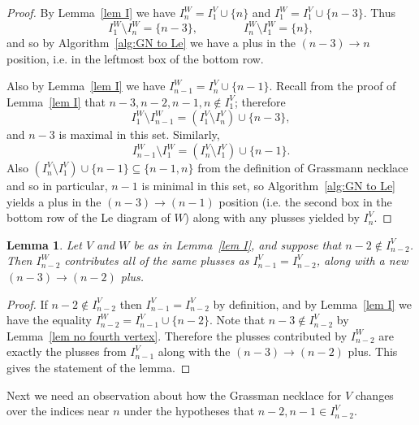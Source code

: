 \documentclass[11pt]{article}
\newtheorem{lem}[thm]{Lemma}
\theoremstyle{remark}
\theoremstyle{definition}
\begin{document}
\begin{proof}
By Lemma~\ref{lem I} we have $I_n^{W}= I_1^{V} \cup \{n\}$ and $I_1^{W} = I_1^{V} \cup \{n-3\}$. Thus 
\[I_1^{W} \setminus I_n^{W} = \{n-3\}, \qquad \qquad I_n^{W} \setminus I_1^{W} = \{n\},\]
and so by Algorithm~\ref{alg:GN to Le} we have a plus in the $(n-3) \rightarrow n$ position, i.e. in the leftmost box of the bottom row. 

Also by Lemma~\ref{lem I} we have $I_{n-1}^{W} = I_n^{V} \cup \{n-1\}$. Recall from the proof of Lemma~\ref{lem I} that $n-3,n-2,n-1,n \not\in I_1^V$; therefore
\[
I_1^W\setminus I_{n-1}^W = (I_1^V \setminus I_n^V) \cup\{n-3\},
\]
and $n-3$ is maximal in this set. Similarly, 
\[I_{n-1}^W \setminus I_1^W = (I_n^V \setminus I_1^V) \cup \{n-1\}.
\]
Also $(I_n^V \setminus I_1^V) \cup \{n-1\}\subseteq \{n-1,n\}$ from the definition of Grassmann necklace and so in particular, $n-1$ is minimal in this set, so Algorithm~\ref{alg:GN to Le} yields a plus in the $(n-3) \rightarrow (n-1)$ position (i.e. the second box in the bottom row of the Le diagram of $W$) along with any plusses yielded by $I_n^V$.
\end{proof} 



\begin{lem}\label{lem n-2 good}
  Let $V$ and $W$ be as in Lemma~\ref{lem I}, and suppose that $n-2 \not\in I_{n-2}^{V}$. Then $I_{n-2}^{W}$ contributes all of the same plusses as $I_{n-1}^{V}=I_{n-2}^{V}$, along with a new $(n-3)\rightarrow (n-2)$ plus.
\end{lem}

\begin{proof}
If $n-2\not\in I_{n-2}^{V}$ then $I_{n-1}^{V}=I_{n-2}^{V}$ by definition, and by Lemma~\ref{lem I} we have the equality ${I_{n-2}^{W} = I_{n-1}^{V} \cup \{n-2\}}$.  Note that $n-3\not\in I_{n-2}^{V}$ by Lemma~\ref{lem no fourth vertex}.  Therefore the plusses contributed by $I_{n-2}^{W}$ are exactly the  plusses from $I_{n-1}^{V}$ along with the $(n-3)\rightarrow (n-2)$ plus.  This gives the statement of the lemma.
\end{proof}

Next we need an observation about how the Grassman necklace for $V$ changes over the indices near $n$ under the hypotheses that $n-2, n-1\in I_{n-2}^V$.
\end{document}
